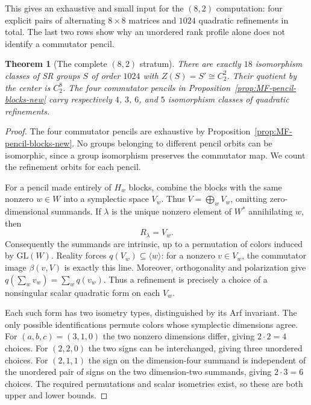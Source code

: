 \documentclass[11pt,a4paper]{amsart}
\newtheorem{thm}{Theorem}[section]
\theoremstyle{definition}
\theoremstyle{remark}
\numberwithin{equation}{section}
\begin{document}
This gives an exhaustive and small input for the $(8,2)$ computation:
four explicit pairs of alternating $8\times8$ matrices and $1024$
quadratic refinements in total. The last two rows show why an unordered
rank profile alone does not identify a commutator pencil.



\begin{thm}[The complete $(8,2)$ stratum]
\label{thm:pencil-eighteen-new}
There are exactly $18$ isomorphism classes of SR groups $S$ of order
$1024$ with $Z(S)=S'\cong C_2^2$. Their quotient by the center is
$C_2^8$. The four commutator pencils in
Proposition~\ref{prop:MF-pencil-blocks-new} carry respectively
$4$, $3$, $6$, and $5$ isomorphism classes of quadratic refinements.
\end{thm}
\begin{proof}
The four commutator pencils are exhaustive by
Proposition~\ref{prop:MF-pencil-blocks-new}. No groups belonging to
different pencil orbits can be isomorphic, since a group isomorphism
preserves the commutator map. We count the refinement orbits for
each pencil.

For a pencil made entirely of $H_w$ blocks, combine the blocks with
the same nonzero $w\in W$ into a symplectic space $V_w$. Thus
$V=\bigoplus_w V_w$, omitting zero-dimensional summands. If
$\lambda$ is the unique nonzero element of $W^*$ annihilating $w$,
then
\[
 R_\lambda=V_w.
\]
Consequently the summands are intrinsic, up to a permutation of
colors induced by $\mathrm{GL}(W)$. Reality forces
$q(V_w)\subseteq\langle w\rangle$: for a nonzero $v\in V_w$,
the commutator image $\beta(v,V)$ is exactly this line. Moreover,
orthogonality and polarization give
$q(\sum_wv_w)=\sum_wq(v_w)$. Thus a refinement is precisely a
choice of a nonsingular scalar quadratic form on each $V_w$.

Each such form has two isometry types, distinguished by its Arf
invariant. The only possible identifications permute colors whose
symplectic dimensions agree. For $(a,b,c)=(3,1,0)$ the two nonzero
dimensions differ, giving $2\cdot2=4$ choices. For $(2,2,0)$ the
two signs can be interchanged, giving three unordered choices.
For $(2,1,1)$ the sign on the dimension-four summand is independent
of the unordered pair of signs on the two dimension-two summands,
giving $2\cdot3=6$ choices. The required permutations and scalar
isometries exist, so these are both upper and lower bounds.


\end{proof}
\end{document}
